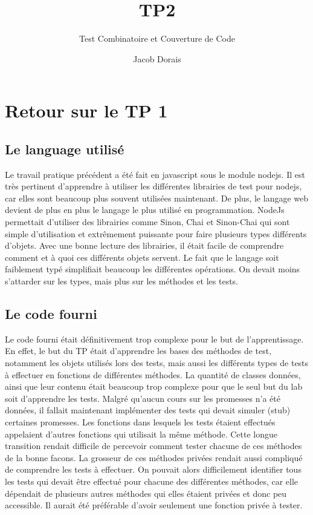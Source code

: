 \documentclass[11pt]{article}
\title{TP2}
\subtitle{Test Combinatoire et Couverture de Code}
\author{Jacob Dorais}{Billy Bouchard}{Gr 02}
\begin{document}
\maketitle
\section{Retour sur le TP 1}
\subsection{Le language utilisé}
Le travail pratique précédent a été fait en javascript sous le module nodejs.
Il est très pertinent d'apprendre à utiliser les différentes librairies de test pour nodejs, car elles sont beaucoup plus souvent utilisées maintenant.
De plus, le langage web devient de plus en plus le langage le plus utilisé en programmation.
NodeJs permettait d'utiliser des librairies comme Sinon, Chai et Sinon-Chai qui sont simple d'utilisation et extrêmement puissante pour faire plusieurs types différents d'objets.
Avec une bonne lecture des librairies, il était facile de comprendre comment et à quoi ces différents objets servent.
Le fait que le langage soit faiblement typé simplifiait beaucoup les différentes opérations. On devait moins s'attarder sur les types, mais plus sur les méthodes et les tests.
\subsection{Le code fourni}
Le code fourni était définitivement trop complexe pour le but de l'apprentissage.
En effet, le but du TP était d'apprendre les bases des méthodes de test, notamment les objets utilisés lors des tests, mais aussi les différents types de tests à effectuer en fonctions de différentes méthodes.
La quantité de classes données, ainsi que leur contenu était beaucoup trop complexe pour que le seul but du lab soit d'apprendre les tests.
Malgré qu'aucun cours sur les promesses n’a été données, il fallait maintenant implémenter des tests qui devait simuler (stub) certaines promesses.
Les fonctions dans lesquels les tests étaient effectués appelaient d'autres fonctions qui utilisait la même méthode.
Cette longue transition rendait difficile de percevoir comment tester chacune de ces méthodes de la bonne facons.
La grosseur de ces méthodes privées rendait aussi compliqué de comprendre les tests à effectuer.
On pouvait alors difficilement identifier tous les tests qui devait être effectué pour chacune des différentes méthodes, car elle dépendait de plusieurs autres méthodes qui elles étaient privées et donc peu accessible.
Il aurait été préférable d'avoir seulement une fonction privée à tester.
\end{document}
